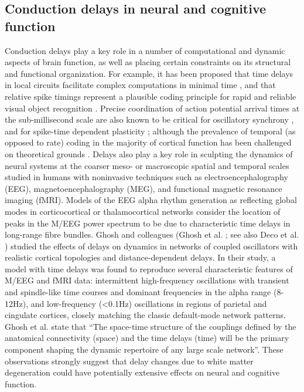
\subsection{Conduction delays in neural and cognitive function}

Conduction delays play a key role in a number of computational and dynamic aspects of brain function, as well as placing certain constraints on its structural and functional organization. For example, it has been proposed that time delays in local circuits facilitate complex computations in minimal time \citep{izhikevich2006polychronization}, and that relative spike timings represent a plausible coding principle for rapid and reliable visual object recognition \citep{vanrullen2002surfing}. Precise coordination of action potential arrival times at the sub-millisecond scale are also known to be critical for oscillatory synchrony \citep{fries2005a}, and for spike-time dependent plasticity 
\citep{markram1997regulation, zhang1998a}; although the prevalence of temporal (as opposed to rate) coding in the majority of cortical function has been challenged on theoretical grounds \citep{shadlen1998the}. Delays also play a key role in sculpting the dynamics of neural systems at the coarser meso- or macroscopic spatial and temporal scales studied in humans with noninvasive techniques such as electroencephalography (EEG), magnetoencephalography (MEG), and functional magnetic resonance imaging (fMRI). Models of the EEG alpha rhythm generation as reflecting global modes in corticocortical \citep{nunez2006electric}  or thalamocortical \citep{robinson2003neurophysical} networks consider the location of peaks in the M/EEG power spectrum to be due to characteristic time delays in long-range fibre bundles. Ghosh and colleagues (Ghosh et al. \citeyear{ghosh2008noise}; see also Deco et al. \citeyear{deco2009key}) studied the effects of delays on dynamics in networks of coupled oscillators with realistic cortical topologies and distance-dependent delays. In their study, a model with time delays was found to reproduce several characteristic features of M/EEG and fMRI data: intermittent high-frequency oscillations with transient and spindle-like time courses and dominant frequencies in the alpha range (8-12Hz), and low-frequency (<0.1Hz) oscillations in regions of parietal and cingulate cortices, closely matching the classic default-mode network patterns.  Ghosh et al. state that “The space-time structure of the couplings defined by the anatomical connectivity (space) and the time delays (time) will be the primary component shaping
the dynamic repertoire of any large scale network”. These observations strongly suggest that delay changes due to white matter degeneration could have potentially extensive effects on neural and cognitive function. 

